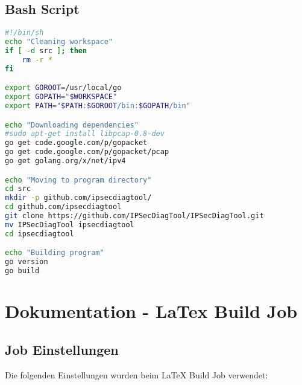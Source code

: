 \subsection{Bash Script}
\begin{lstlisting}[language=bash]
#!/bin/sh
echo "Cleaning workspace"
if [ -d src ]; then
	rm -r *
fi

export GOROOT=/usr/local/go
export GOPATH="$WORKSPACE"
export PATH="$PATH:$GOROOT/bin:$GOPATH/bin"

echo "Downloading dependencies"
#sudo apt-get install libpcap-0.8-dev
go get code.google.com/p/gopacket
go get code.google.com/p/gopacket/pcap
go get golang.org/x/net/ipv4

echo "Moving to program directory"
cd src
mkdir -p github.com/ipsecdiagtool/
cd github.com/ipsecdiagtool
git clone https://github.com/IPSecDiagTool/IPSecDiagTool.git
mv IPSecDiagTool ipsecdiagtool
cd ipsecdiagtool

echo "Building program"
go version
go build
\end{lstlisting}



\section{Dokumentation - LaTex Build Job}

\subsection{Job Einstellungen}
Die folgenden Einstellungen wurden beim LaTeX Build Job verwendet:

